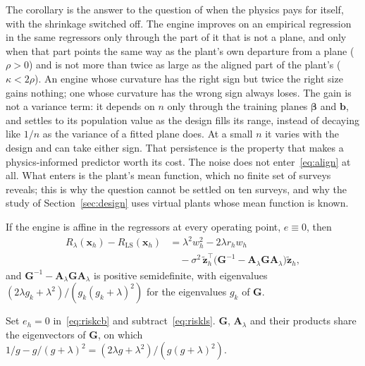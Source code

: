 The corollary is the answer to the question of when the physics pays for itself, with the shrinkage switched off. The
engine improves on an empirical regression in the same regressors only through the part of it that is not a plane, and only
when that part points the same way as the plant's own departure from a plane ($\rho>0$) and is not more than twice as large
as the aligned part of the plant's ($\kappa<2\rho$). An engine whose curvature has the right sign but twice the right size
gains nothing; one whose curvature has the wrong sign always loses. The gain is not a variance term: it depends on $n$ only
through the training planes $\boldsymbol\beta$ and $\mathbf b$, and settles to its population value as the design fills its
range, instead of decaying like $1/n$ as the variance of a fitted plane does. At a small $n$ it varies with the design and can
take either sign. That persistence is the property that makes a physics-informed predictor worth its cost.
The noise does not enter~\eqref{eq:align} at all. What enters is the plant's mean function, which no finite set of surveys
reveals; this is why the question cannot be settled on ten surveys, and why the study of Section~\ref{sec:design} uses
virtual plants whose mean function is known.

\begin{corollary}\label{cor:affine}
If the engine is affine in the regressors at every operating point, $e\equiv0$, then
\begin{equation}
\begin{split}
R_\lambda(\mathbf x_h)-R_{\mathrm{LS}}(\mathbf x_h)&=\lambda^2w_h^2-2\lambda r_hw_h\\
&\quad-\sigma^2\,\tilde{\mathbf z}_h^{\top}\big(\mathbf G^{-1}-\mathbf A_\lambda\mathbf G\mathbf A_\lambda\big)\tilde{\mathbf z}_h ,
\end{split}
\label{eq:affine}
\end{equation}
and $\mathbf G^{-1}-\mathbf A_\lambda\mathbf G\mathbf A_\lambda$ is positive semidefinite, with eigenvalues
$(2\lambda g_k+\lambda^2)/(g_k(g_k+\lambda)^2)$ for the eigenvalues $g_k$ of $\mathbf G$.
\end{corollary}
\begin{IEEEproof}
Set $e_h=0$ in~\eqref{eq:riskcb} and subtract~\eqref{eq:riskls}. $\mathbf G$, $\mathbf A_\lambda$ and their products share the
eigenvectors of $\mathbf G$, on which $1/g-g/(g+\lambda)^2=(2\lambda g+\lambda^2)/(g(g+\lambda)^2)$.
\end{IEEEproof}

